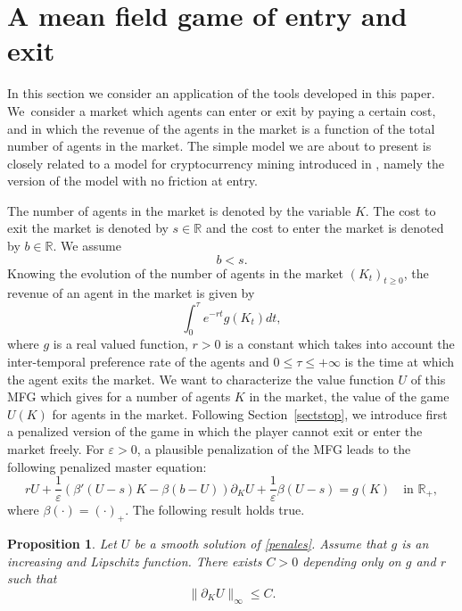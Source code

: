 \documentclass[JEP,XML,SOM,Unicode,NoEqCountersInSection,published]{cedram}
\let\epsilon\varepsilon
\newtheorem{Prop}{Proposition}[section]
\theoremstyle{definition}
\begin{document}
\section{A mean field game of entry and exit}\label{sec:5}
In this section we consider an application of the tools developed in this paper. We~consider a market which agents can enter or exit by paying a certain cost, and in which the revenue of the agents in the market is a function of the total number of agents in the market. The simple model we are about to present is closely related to a model for cryptocurrency mining introduced in \cite{bertucci2020mean}, namely the version of the model with no friction at entry.

The number of agents in the market is denoted by the variable $K$. The cost to exit the market is denoted by $s \in \mathbb{R}$ and the cost to enter the market is denoted by $b \in \mathbb{R}$. We assume\vspace*{-5pt}
\begin{equation*}
b < s.
\end{equation*}
Knowing the evolution of the number of agents in the market $(K_t)_{t \geq 0}$, the revenue of an agent in the market is given by\vspace*{-5pt}
\begin{equation*}
\int_0^{\tau} e^{-rt}g(K_t)dt,
\end{equation*}
where $g$ is a real valued function, $r> 0$ is a constant which takes into account the inter-temporal preference rate of the agents and $0\leq \tau \leq+\infty$ is the time at which the agent exits the market. We want to characterize the value function $U$ of this MFG which gives for a number of agents $K$ in the market, the value of the game $U(K)$ for agents in the market. Following Section~\ref{sectstop}, we introduce first a penalized version of the game in which the player cannot exit or enter the market freely. For $\epsilon > 0$, a plausible penalization of the MFG leads to the following penalized master equation:\vspace*{-3pt}
\begin{equation}\label{penales}
rU+\frac{1}{\epsilon} \left(\beta'(U-s)K-\beta(b-U)\right)\partial_K U+\frac{1}{\epsilon} \beta(U -s) = g(K) \quad\text{in } \mathbb{R}_+,
\end{equation}
where $\beta(\cdot) = (\cdot)_+$. The following result holds true.
\begin{Prop}
Let $U$ be a smooth solution of \eqref{penales}. Assume that $g$ is an increasing and Lipschitz function. There exists $C > 0$ depending only on $g$ and $r$ such that
\begin{equation*}
\|\partial_K U\|_{\infty} \leq C.
\end{equation*}
\end{Prop}
\end{document}
